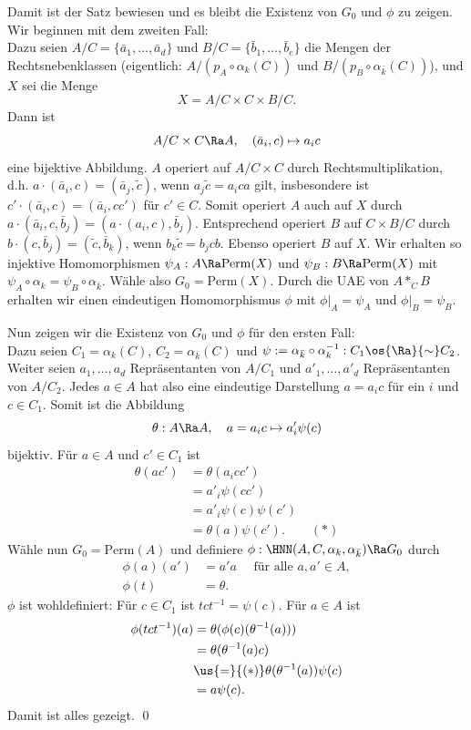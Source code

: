 Damit ist der Satz bewiesen und es bleibt die Existenz von $G_0$
und $\phi$ zu zeigen. Wir beginnen mit dem zweiten Fall:\\
Dazu seien $A/C=\{\bar{a}_1,\ldots,\bar{a}_d\}$ und
$B/C=\{\bar{b}_1,\ldots,\bar{b}_e\}$ die Mengen der Rechtsnebenklassen
(eigentlich: $A/(p_A\circ\alpha_k(C))$ und
$B/(p_B\circ\alpha_{\bar{k}}(C))$), und $X$ sei die Menge
\[
X = A/C \times C \times B/C.
\]
Dann ist
\[
A/C \times C \Ra A, \quad (\bar{a}_i,c)\mapsto a_i c
\]
eine bijektive Abbildung. $A$ operiert auf $A/C\times C$ durch
Rechtsmultiplikation,
d.h. $a\cdot(\bar{a}_i,c)=(\bar{a}_j,\tilde{c})$, wenn
$a_j\tilde{c}=a_i c a$ gilt, insbesondere ist
$c'\cdot(\bar{a}_i,c)=(\bar{a}_i,cc')$ für $c'\in C$.
Somit operiert $A$ auch auf $X$ durch
$a\cdot(\bar{a}_i,c,\bar{b}_j)=(a\cdot(a_i,c),\bar{b}_j)$.
Entsprechend operiert $B$ auf $C\times B/C$ durch
$b\cdot(c,\bar{b}_j)=(\tilde{c},\bar{b}_k)$, wenn
$b_k\tilde{c}=b_j c b$. Ebenso operiert $B$ auf $X$.
Wir erhalten so injektive Homomorphismen
$\psi_A:A\Ra\mathrm{Perm}(X)$ und $\psi_B:B\Ra\mathrm{Perm}(X)$ mit
$\psi_A\circ\alpha_k=\psi_B\circ\alpha_{\bar{k}}$.
Wähle also $G_0=\mathrm{Perm}(X)$. Durch die UAE von $A*_C B$
erhalten wir einen eindeutigen Homomorphismus $\phi$ mit
$\phi|_A=\psi_A$ und $\phi|_B=\psi_B$.

Nun zeigen wir die Existenz von $G_0$ und $\phi$ für den ersten
Fall:\\
Dazu seien $C_1=\alpha_k(C)$, $C_2=\alpha_{\bar{k}}(C)$ und
$\psi:=\alpha_{\bar{k}}\circ\alpha_k^{-1}:C_1\os{\Ra}{\sim} C_2$.
Weiter seien $a_1,\ldots,a_d$ Repräsentanten von $A/C_1$ und
$a'_1,\ldots,a'_d$ Repräsentanten von $A/C_2$. Jedes $a\in A$ hat
also eine eindeutige Darstellung $a=a_i c$ für ein $i$ und $c\in C_1$.
Somit ist die Abbildung
\[
\theta:A\Ra A,\quad a=a_i c \mapsto a_i' \psi(c)
\]
bijektiv.
Für $a\in A$ und $c'\in C_1$ ist
\begin{align*}
\theta(ac') &= \theta(a_i c c') \\
&= a'_i \psi(cc') \\
&= a'_i \psi(c)\psi(c') \\
&= \theta(a)\psi(c'). \qquad (*)
\end{align*}
Wähle nun $G_0=\mathrm{Perm}(A)$ und definiere
$\phi:\HNN(A,C,\alpha_k,\alpha_{\bar{k}})\Ra G_0$ durch
\begin{align*}
\phi(a)(a')&=a' a\quad \text{ für alle } a,a'\in A, \\
\phi(t)&=\theta.
\end{align*}
$\phi$ ist wohldefiniert: Für $c\in C_1$ ist $tct^{-1}=\psi(c)$.
Für $a\in A$ ist
\begin{align*}
\phi(tct^{-1})(a) &= \theta(\phi(c)(\theta^{-1}(a))) \\
&= \theta(\theta^{-1}(a)c) \\
&\us{=}{(*)} \theta(\theta^{-1}(a)) \psi(c) \\
&= a \psi(c).
\end{align*}
Damit ist alles gezeigt.
\qed

